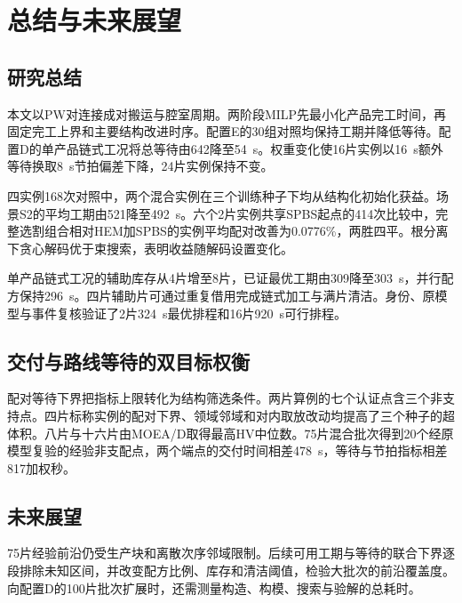 \chapter{总结与未来展望}
\section{研究总结}
本文以PW对连接成对搬运与腔室周期。两阶段MILP先最小化产品完工时间，再固定完工上界和主要结构改进时序。配置E的30组对照均保持工期并降低等待。配置D的单产品链式工况将总等待由642降至54~s。权重变化使16片实例以16~s额外等待换取8~s节拍偏差下降，24片实例保持不变。

四实例168次对照中，两个混合实例在三个训练种子下均从结构化初始化获益。场景S2的平均工期由521降至492~s。六个2片实例共享SPBS起点的414次比较中，完整选割组合相对HEM加SPBS的实例平均配对改善为0.0776\%，两胜四平。根分离下贪心解码优于束搜索，表明收益随解码设置变化。

单产品链式工况的辅助库存从4片增至8片，已证最优工期由309降至303~s，并行配方保持296~s。四片辅助片可通过重复借用完成链式加工与满片清洁。身份、原模型与事件复核验证了2片324~s最优排程和16片920~s可行排程。

\section{交付与路线等待的双目标权衡}
配对等待下界把指标上限转化为结构筛选条件。两片算例的七个认证点含三个非支持点。四片标称实例的配对下界、领域邻域和对内取放改动均提高了三个种子的超体积。八片与十六片由MOEA/D取得最高HV中位数。75片混合批次得到20个经原模型复验的经验非支配点，两个端点的交付时间相差478~s，等待与节拍指标相差817加权秒。

\section{未来展望}
75片经验前沿仍受生产块和离散次序邻域限制。后续可用工期与等待的联合下界逐段排除未知区间，并改变配方比例、库存和清洁阈值，检验大批次的前沿覆盖度。向配置D的100片批次扩展时，还需测量构造、构模、搜索与验解的总耗时。
